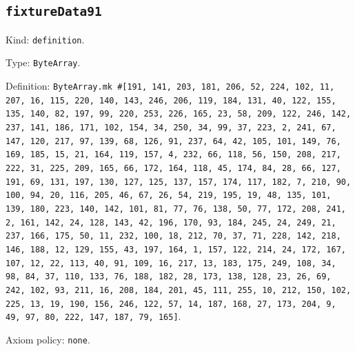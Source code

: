 \documentclass[11pt]{article}
\begin{document}
\subsection*{\texttt{fixtureData91}}
\noindent Kind: \texttt{definition}.\par
\noindent Type: \texttt{ByteArray}.\par
\noindent Definition: \texttt{ByteArray.mk \#[191, 141, 203, 181, 206, 52, 224, 102, 11, 207, 16, 115, 220, 140, 143, 246, 206, 119, 184, 131, 40, 122, 155, 135, 140, 82, 197, 99, 220, 253, 226, 165, 23, 58, 209, 122, 246, 142, 237, 141, 186, 171, 102, 154, 34, 250, 34, 99, 37, 223, 2, 241, 67, 147, 120, 217, 97, 139, 68, 126, 91, 237, 64, 42, 105, 101, 149, 76, 169, 185, 15, 21, 164, 119, 157, 4, 232, 66, 118, 56, 150, 208, 217, 222, 31, 225, 209, 165, 66, 172, 164, 118, 45, 174, 84, 28, 66, 127, 191, 69, 131, 197, 130, 127, 125, 137, 157, 174, 117, 182, 7, 210, 90, 100, 94, 20, 116, 205, 46, 67, 26, 54, 219, 195, 19, 48, 135, 101, 139, 180, 223, 140, 142, 101, 81, 77, 76, 138, 50, 77, 172, 208, 241, 2, 161, 142, 24, 128, 143, 42, 196, 170, 93, 184, 245, 24, 249, 21, 237, 166, 175, 50, 11, 232, 100, 18, 212, 70, 37, 71, 228, 142, 218, 146, 188, 12, 129, 155, 43, 197, 164, 1, 157, 122, 214, 24, 172, 167, 107, 12, 22, 113, 40, 91, 109, 16, 217, 13, 183, 175, 249, 108, 34, 98, 84, 37, 110, 133, 76, 188, 182, 28, 173, 138, 128, 23, 26, 69, 242, 102, 93, 211, 16, 208, 184, 201, 45, 111, 255, 10, 212, 150, 102, 225, 13, 19, 190, 156, 246, 122, 57, 14, 187, 168, 27, 173, 204, 9, 49, 97, 80, 222, 147, 187, 79, 165]}.\par
\noindent Axiom policy: \texttt{none}.\par
\end{document}

